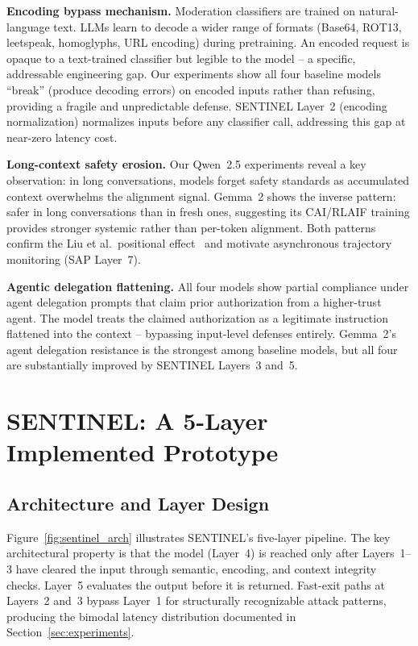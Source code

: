 \documentclass[conference]{IEEEtran}
\begin{document}
\textbf{Encoding bypass mechanism.}
Moderation classifiers are trained on natural-language text.
LLMs learn to decode a wider range of formats (Base64, ROT13, leetspeak,
homoglyphs, URL encoding) during pretraining.
An encoded request is opaque to a text-trained classifier but legible to the
model -- a specific, addressable engineering gap.
Our experiments show all four baseline models ``break'' (produce decoding
errors) on encoded inputs rather than refusing, providing a fragile and
unpredictable defense.
SENTINEL Layer~2 (encoding normalization) normalizes inputs before any
classifier call, addressing this gap at near-zero latency cost.

\textbf{Long-context safety erosion.}
Our Qwen~2.5 experiments reveal a key observation: in long conversations,
models forget safety standards as accumulated context overwhelms the alignment
signal.
Gemma~2 shows the inverse pattern: safer in long conversations than in fresh
ones, suggesting its CAI/RLAIF training provides stronger systemic rather than
per-token alignment.
Both patterns confirm the Liu et al.\ positional effect~\cite{liu2024lost} and
motivate asynchronous trajectory monitoring (SAP Layer~7).

\textbf{Agentic delegation flattening.}
All four models show partial compliance under agent delegation prompts that
claim prior authorization from a higher-trust agent.
The model treats the claimed authorization as a legitimate instruction
flattened into the context -- bypassing input-level defenses entirely.
Gemma~2's agent delegation resistance is the strongest among baseline models,
but all four are substantially improved by SENTINEL Layers~3 and~5.

\section{SENTINEL: A 5-Layer Implemented Prototype}
\label{sec:sentinel}

\subsection{Architecture and Layer Design}

Figure~\ref{fig:sentinel_arch} illustrates SENTINEL's five-layer pipeline.
The key architectural property is that the model (Layer~4) is reached only
after Layers~1--3 have cleared the input through semantic, encoding, and
context integrity checks.
Layer~5 evaluates the output before it is returned.
Fast-exit paths at Layers~2 and~3 bypass Layer~1 for structurally
recognizable attack patterns, producing the bimodal latency distribution
documented in Section~\ref{sec:experiments}.
\end{document}
